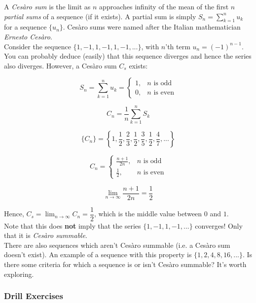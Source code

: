 \documentclass[12pt, a4paper, titlepage, twoside]{article}
\begin{document}
	\begin{fr}
		A \textit{Ces\`{a}ro sum} is the limit as $n$ approaches infinity of the mean of the first $n$ \textit{partial sums} of a sequence 
		(if it exists). A partial sum is simply $S_n = \displaystyle \sum_{k=1}^n u_k$ for a sequence $\{u_n\}$. Ces\`{a}ro sums were
		named after the Italian mathematician \textit{Ernesto Ces\`{a}ro}.\\
		
		Consider the sequence $\{1, -1, 1, -1, 1, -1, ...\}$, with $n$'th term $u_n = (-1)^{n-1}$. You can probably deduce (easily) that
		this sequence diverges and hence the series also diverges. However, a Ces\`{a}ro sum $C_s$ exists:
		
		$$S_n = \displaystyle \sum_{k=1}^n u_k = \begin{cases} 1, & n \text{ is odd} \\ 0, & n \text{ is even} \end{cases}$$
		
		$$C_n = \dfrac{1}{n} \sum_{k=1}^n S_k$$
		
		$$\{C_n\} = \left\lbrace 1, \frac{1}{2}, \frac{2}{3}, \frac{1}{2}, \frac{3}{5}, \frac{1}{2}, \frac{4}{7}, ... \right\rbrace$$
		
		$$C_n = \begin{cases} \frac{n+1}{2n}, & n \text{ is odd} \\ \frac{1}{2}, & n \text{ is even} \end{cases}$$
		
		$$\lim_{n \to \infty} \frac{n+1}{2n} = \dfrac{1}{2}$$
		
		Hence, $\displaystyle C_s = \lim_{n \to \infty} C_n = \dfrac{1}{2}$, which is the middle value between $0$ and $1$.\\
		
		Note that this does \textbf{not} imply that the series $\{1, -1, 1, -1, ...\}$ converges! Only that it is \textit{Ces\`{a}ro summable}.\\
		
		There are also sequences which aren't Ces\`{a}ro summable (i.e. a Ces\`{a}ro sum doesn't exist). An example of a sequence with
		this property is $\{1, 2, 4, 8, 16, ...\}$. Is there some criteria for which a sequence is or isn't Ces\`{a}ro summable? It's worth 
		exploring.
	\end{fr}
	
	\subsubsection*{Drill Exercises}
	
\end{document}
